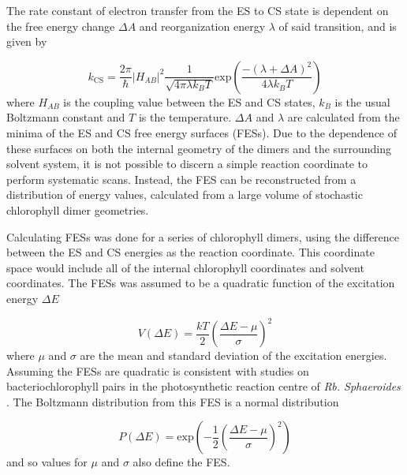 The rate constant of electron transfer from the ES to CS state is dependent on the
free energy change $\Delta A$ and reorganization energy $\lambda$ of said transition,
and is given by

\begin{equation}
    k_{\text{CS}} = \frac{2\pi}{\hbar} \left\lvert H_{AB} \right\rvert^2 \frac{1}{\sqrt{4 \pi \lambda k_B T}}\text{exp}\left(\frac{-\left(\lambda + \Delta A\right)^2}{4 \lambda k_B T}\right)
\end{equation}
%
where $H_{AB}$ is the coupling value between the ES and CS states, $k_B$ is the 
usual Boltzmann constant and $T$ is the temperature. $\Delta A$ and $\lambda$ are
calculated from the minima of the ES and CS free energy surfaces (FESs). Due to
the dependence of these surfaces on both the internal geometry of the dimers and
the surrounding solvent system, it is not possible to discern a simple reaction 
coordinate to perform systematic scans. Instead, the FES can be reconstructed from 
a distribution of energy values, calculated from a large volume of stochastic chlorophyll 
dimer geometries.

Calculating FESs was done for a series of chlorophyll dimers, using the difference
between the ES and CS energies as the reaction coordinate. This coordinate space
would include all of the internal chlorophyll coordinates and solvent coordinates. 
The FESs was assumed to be a quadratic function of the excitation energy $\Delta E$

\begin{equation}
    V\left(\Delta E\right) = \frac{kT}{2} \left( \frac{\Delta E - \mu}{\sigma}\right)^2
\end{equation}
%
where $\mu$ and $\sigma$ are the mean and standard deviation of the excitation energies.
Assuming the FESs are quadratic is consistent with studies on bacteriochlorophyll 
pairs in the photosynthetic reaction centre of \emph{Rb. Sphaeroides} \cite{Warshel2001}.
The Boltzmann distribution from this FES is a normal distribution

\begin{equation}
    P\left(\Delta E\right) = \text{exp} \left(-\frac{1}{2}\left(\frac{\Delta E - \mu}{\sigma}\right)^2\right)
    \label{eq:FES_normdist}
\end{equation}
%
and so values for $\mu$ and $\sigma$ also define the FES. 

